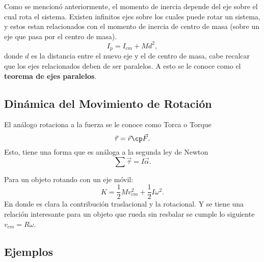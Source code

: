 Como se mencionó anteriormente, el momento de inercia depende  del eje sobre el cual rota el sistema. Existen infinitos ejes sobre los cuales puede rotar un sistema, y estos estan relacionados con el momento de inercia de centro de masa (sobre un eje que pasa por el centro de masa).
	$$ I_p = I_{cm} + Md^2, $$
donde $d$ es la distancia entre el nuevo eje y el de centro de masa, cabe recalcar que los ejes relacionados deben de ser paralelos. A esto se le conoce como el \textbf{teorema de ejes paralelos}.

\subsection*{Dinámica del Movimiento de Rotación}

El análogo rotaciona a la fuerza se le conoce como Torca o Torque
	$$ \vec{\tau} = \vec{r} \cp \vec{F}. $$
Esto, tiene una forma que es análoga a la segunda ley de Newton
	$$ \sum \vec{\tau} = I \vec{\alpha}. $$


Para un objeto rotando con un eje móvil:
	$$ K = \frac{1}{2} Mv_{cm} ^2 + \frac{1}{2} I \omega ^2. $$
En donde es clara la contribución traslacional y la rotacional. Y se tiene una relación interesante para un objeto que rueda sin resbalar se cumple lo siguiente $v_{cm} = R\omega$.






\pagebreak




\subsection*{Ejemplos}

